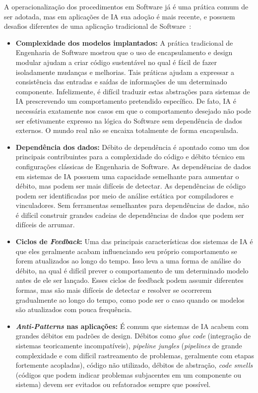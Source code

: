 \documentclass[portugues]{ic-tese}
\begin{document}
A operacionalização dos procedimentos em Software já é uma prática comum de ser adotada, mas em aplicações de IA sua adoção é mais recente, e possuem desafios diferentes de uma aplicação tradicional de Software~\cite{Sculley_2015}:

\begin{itemize}
    \item \textbf{Complexidade dos modelos implantados:} A prática tradicional de Engenharia de Software mostrou que o uso de encapsulamento e design modular ajudam a criar código sustentável no qual é fácil de fazer isoladamente mudanças e melhorias. Tais práticas ajudam a expressar a consistência das entradas e saídas de informações de um determinado componente. Infelizmente, é difícil traduzir estas abstrações para sistemas de IA prescrevendo um comportamento pretendido específico. De fato, IA é necessária exatamente nos casos em que o comportamento desejado não pode ser efetivamente expresso na lógica do Software sem dependência de dados externos. O mundo real não se encaixa totalmente de forma encapsulada.
    \item \textbf{Dependência dos dados:} Débito de dependência é apontado como um dos principais contribuintes para a complexidade do código e débito técnico em configurações clássicas de Engenharia de Software. As dependências de dados em sistemas de IA possuem uma capacidade semelhante para aumentar o débito, mas podem ser mais difíceis de detectar. As dependências de código podem ser identificadas por meio de análise estática por compiladores e vinculadores. Sem ferramentas semelhantes para dependências de dados, não é difícil construir grandes cadeias de dependências de dados que podem ser difíceis de arrumar.
    \item \textbf{Ciclos de \textit{Feedback}:} Uma das principais características dos sistemas de IA é que eles geralmente acabam influenciando seu próprio comportamento se forem atualizados ao longo do tempo. Isso leva a uma forma de análise do débito, na qual é difícil prever o comportamento de um determinado modelo antes de ele ser lançado. Esses ciclos de feedback podem assumir diferentes formas, mas são mais difíceis de detectar e resolver se ocorrerem gradualmente ao longo do tempo, como pode ser o caso quando os modelos são atualizados com pouca frequência.
    \item \textbf{\textit{Anti-Patterns} nas aplicações:} É comum que sistemas de IA acabem com grandes débitos em padrões de design. Débitos como \textit{glue code} (integração de sistemas teoricamente incompatíveis), \textit{pipeline jungles} (\textit{pipelines} de grande complexidade e com difícil rastreamento de problemas, geralmente com etapas fortemente acopladas), código não utilizado, débitos de abstração, \textit{code smells} (códigos que podem indicar problemas subjacentes em um componente ou sistema) devem ser evitados ou refatorados sempre que possível.

\end{itemize}
\end{document}
